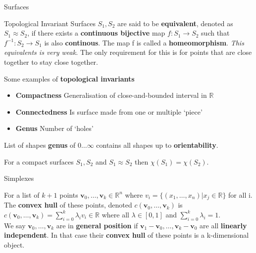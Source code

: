 \documentclass[12pt, letterpaper]{article}
\begin{document}
\begin{section}{Surfaces}
\begin{subsection}{Topological Invariant}
    Surfaces \(S_{1}, S_{2}\) are said to be \textbf{equivalent}, denoted as
    \(S_{1} \approx S_{2}\), if there exists a \textbf{continuous bijective}
    map \(f: S_{1} \to S_{2}\) such that \(f^{-1}: S_{2} \to S_{1}\) is also
    \textbf{continous}. The map f is called a \textbf{homeomorphism}.
    \emph{This equivalents is very weak.} The only requirement for this is
    for points that are close together to stay close together.

    Some examples of \textbf{topological invariants}
    \begin{itemize}
      \item \textbf{Compactness}
            Generalisation of close-and-bounded interval in \(\mathbb{R}\)
      \item \textbf{Connectedness}
            Is surface made from one or multiple `piece'
      \item \textbf{Genus}
            Number of `holes'
    \end{itemize}

    List of shapes \textbf{genus} of \(0 \dots \infty\) contains all shapes
    up to \textbf{orientability}.

    For a compact surfaces \(S_{1}, S_{2}\) and \(S_{1} \approx S_{2}\) then
    \(\chi(S_{1}) = \chi(S_{2})\).

  \end{subsection}

  \begin{subsection}{Simplexes}

    For a list of \(k + 1\) points \(\textbf{v}_{0}, \dots , \textbf{v}_{k} \in \mathbb{R}^{n}\)
    where \(v_{i} = \{ (x_{1}, \dots , x_{n}) | x_{j} \in \mathbb{R} \}\) for all i.
    The \textbf{convex hull} of these points, denoted \(c(\textbf{v}_{0}, \dots , \textbf{v}_{k})\) is
    \(c(\textbf{v}_{0}, \dots , \textbf{v}_{k}) = \sum_{i = 0}^{k}\lambda_{i}v_{i} \in \mathbb{R}\)
    where all \(\lambda \in [0, 1]\) and \(\sum_{i = 0}^{k}\lambda_{i} = 1\). \\
    We say \(\textbf{v}_{0}, \dots , \textbf{v}_{k}\) are in \textbf{general position} if
    \(\textbf{v}_{1} - \textbf{v}_{0}, \dots , \textbf{v}_{k} - \textbf{v}_{0}\)
    are all \textbf{linearly independent}. In that case their \textbf{convex hull}
    of these points is a k-dimensional object.


\end{subsection}
\end{section}
\end{document}
